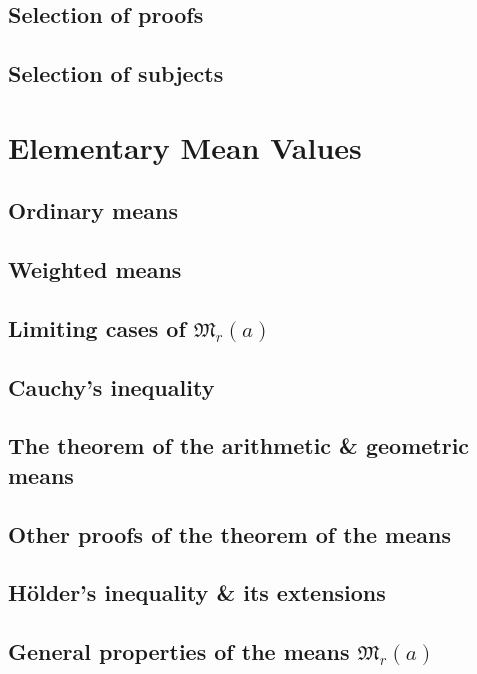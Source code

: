 \documentclass[oneside]{book}
\numberwithin{equation}{section}
\begin{document}
\subsection{Selection of proofs}

\subsection{Selection of subjects}


\section{Elementary Mean Values}

\subsection{Ordinary means}

\subsection{Weighted means}

\subsection{Limiting cases of $\mathfrak{M}_r(a)$}

\subsection{Cauchy's inequality}

\subsection{The theorem of the arithmetic \& geometric means}

\subsection{Other proofs of the theorem of the means}

\subsection{H\"older's inequality \& its extensions}

\subsection{General properties of the means $\mathfrak{M}_r(a)$}
\end{document}
